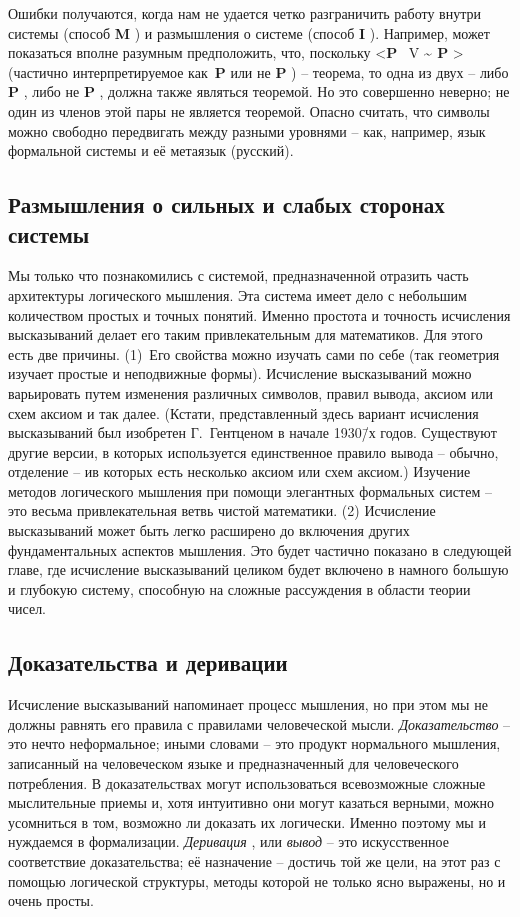 \documentclass[../main.tex]{subfiles}
\begin{document}
Ошибки получаются, когда нам не удается четко разграничить работу внутри системы (способ \textbf{M} ) и размышления о системе (способ \textbf{I} ). Например, может показаться вполне разумным предположить, что, поскольку \textless{}\textbf{P} ~V \textbf{\textasciitilde{} P} \textgreater{} (частично интерпретируемое как~\textbf{P} или не \textbf{P} ) \--- теорема, то одна из двух \--- либо \textbf{P} , либо не \textbf{P} , должна также являться теоремой. Но это совершенно неверно; не один из членов этой пары не является теоремой. Опасно считать, что символы можно свободно передвигать между разными уровнями \--- как, например, язык формальной системы и её метаязык (русский).


\subsection{Размышления о сильных и слабых сторонах системы}

Мы только что познакомились с системой, предназначенной отразить часть архитектуры логического мышления. Эта система имеет дело с небольшим количеством простых и точных понятий. Именно простота и точность исчисления высказываний делает его таким привлекательным для математиков. Для этого есть две причины. (1)~Его свойства можно изучать сами по себе (так геометрия изучает простые и неподвижные формы). Исчисление высказываний можно варьировать путем изменения различных символов, правил вывода, аксиом или схем аксиом и так далее. (Кстати, представленный здесь вариант исчисления высказываний был изобретен Г.~Гентценом в начале 1930\=/х годов. Существуют другие версии, в которых используется единственное правило вывода \--- обычно, отделение \--- ив которых есть несколько аксиом или схем аксиом.) Изучение методов логического мышления при помощи элегантных формальных систем \--- это весьма привлекательная ветвь чистой математики. (2) Исчисление высказываний может быть легко расширено до включения других фундаментальных аспектов мышления. Это будет частично показано в следующей главе, где исчисление высказываний целиком будет включено в намного большую и глубокую систему, способную на сложные рассуждения в области теории чисел.


\subsection{Доказательства и деривации}

Исчисление высказываний напоминает процесс мышления, но при этом мы не должны равнять его правила с правилами человеческой мысли. \emph{Доказательство} \--- это нечто неформальное; иными словами \--- это продукт нормального мышления, записанный на человеческом языке и предназначенный для человеческого потребления. В доказательствах могут использоваться всевозможные сложные мыслительные приемы и, хотя интуитивно они могут казаться верными, можно усомниться в том, возможно ли доказать их логически. Именно поэтому мы и нуждаемся в формализации. \emph{Деривация} , или \emph{вывод} \--- это искусственное соответствие доказательства; её назначение \--- достичь той же цели, на этот раз с помощью логической структуры, методы которой не только ясно выражены, но и очень просты.
\end{document}

